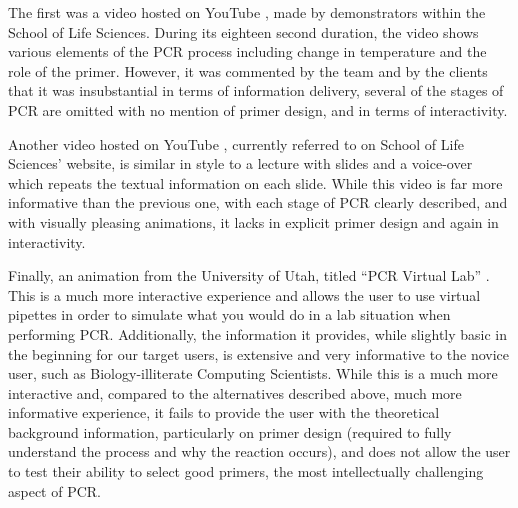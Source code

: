 The first was a video hosted on YouTube \cite{youtube:taqExtension},
made by demonstrators within the School of Life Sciences.
During its eighteen second duration, the video shows various elements
of the PCR process including change in temperature and the role of the
primer.
However, it was commented by the team and by the clients that it was
insubstantial in terms of information delivery, several of the stages
of PCR are omitted with no mention of primer design, and in terms
of interactivity.

Another video hosted on YouTube \cite{youtube:PCR}, currently referred
to on School of Life Sciences' website, is similar in style to a
lecture with slides and a voice-over which repeats the textual
information on each slide.
While this video is far more informative than the previous one, with
each stage of PCR clearly described, and with visually pleasing
animations, it lacks in explicit primer design and again in
interactivity.

Finally, an animation from the University of Utah, titled ``PCR
Virtual Lab'' \cite{genScienceCenter2012}.
This is a much more interactive experience and allows the user to use
virtual pipettes in order to simulate what you would do in a lab
situation when performing PCR.
Additionally, the information it provides, while slightly basic in the
beginning for our target users, is extensive and very informative to
the novice user, such as Biology-illiterate Computing Scientists.
While this is a much more interactive and, compared to the
alternatives described above, much more informative experience, it
fails to provide the user with the theoretical background information,
particularly on primer design (required to fully understand the
process and why the reaction occurs), and does not allow the user to
test their ability to select good primers, the most intellectually
challenging aspect of PCR.																									%
